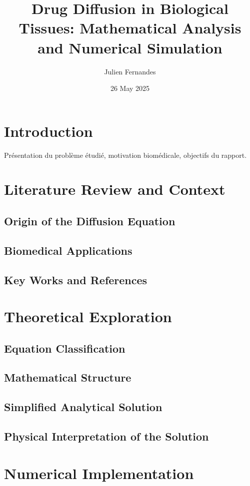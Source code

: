 \documentclass[11pt, a4paper]{article}
\title{Drug Diffusion in Biological Tissues: Mathematical Analysis and Numerical Simulation}
\author{Julien Fernandes}
\date{26 May 2025}
\begin{document}
\maketitle
\tableofcontents
\newpage

\section{Introduction}
Présentation du problème étudié, motivation biomédicale, objectifs du rapport.

\section{Literature Review and Context}
\subsection{Origin of the Diffusion Equation}
\subsection{Biomedical Applications}
\subsection{Key Works and References}

\section{Theoretical Exploration}
\subsection{Equation Classification}
\subsection{Mathematical Structure}
\subsection{Simplified Analytical Solution}
\subsection{Physical Interpretation of the Solution}

\section{Numerical Implementation}
\end{document}
